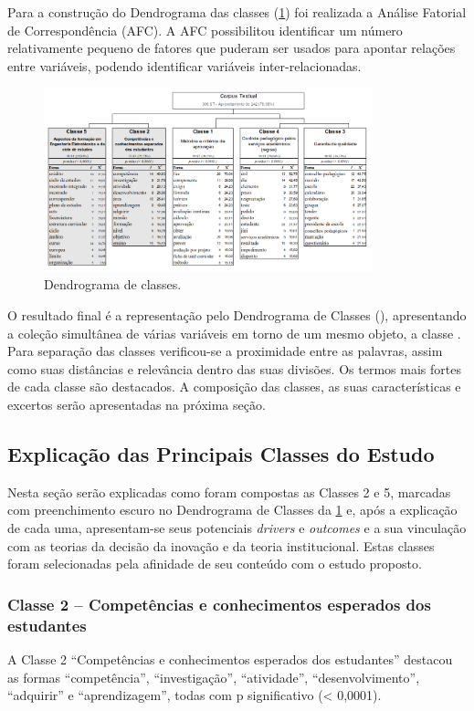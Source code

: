 \documentclass{textolivre}
\begin{document}
Para a construção do Dendrograma das classes (\cref{Fig02}) foi realizada a Análise Fatorial de Correspondência (AFC). A AFC possibilitou identificar um número relativamente pequeno de fatores que puderam ser usados para apontar relações entre variáveis, podendo identificar variáveis inter-relacionadas.

\begin{figure}[htbp]
 \centering
 \includegraphics[width=0.85\textwidth]{Fig02.png}
 \caption{Dendrograma de classes.}
 \label{Fig02}
\end{figure}

O resultado final é a representação pelo Dendrograma de Classes (), apresentando a coleção simultânea de várias variáveis em torno de um mesmo objeto, a classe \cite{lebart1994}. Para separação das classes verificou-se a proximidade entre as palavras, assim como suas distâncias e relevância dentro das suas divisões. Os termos mais fortes de cada classe são destacados. A composição das classes, as suas características e excertos serão apresentadas na próxima seção.

\subsection{Explicação das Principais Classes do Estudo}\label{sec-explicacao}
Nesta seção serão explicadas como foram compostas as Classes 2 e 5, marcadas com preenchimento escuro no Dendrograma de Classes da \cref{Fig02} e, após a explicação de cada uma, apresentam-se seus potenciais \textit{drivers} e \textit{outcomes} e a sua vinculação com as teorias da decisão da inovação e da teoria institucional. Estas classes foram selecionadas pela afinidade de seu conteúdo com o estudo proposto.

\subsubsection{Classe 2 – Competências e conhecimentos esperados dos estudantes}\label{sec-classe}
A Classe 2 “Competências e conhecimentos esperados dos estudantes” destacou as formas “competência”, “investigação”, “atividade”, “desenvolvimento”, “adquirir” e “aprendizagem”, todas com p significativo (< 0,0001).
\end{document}
